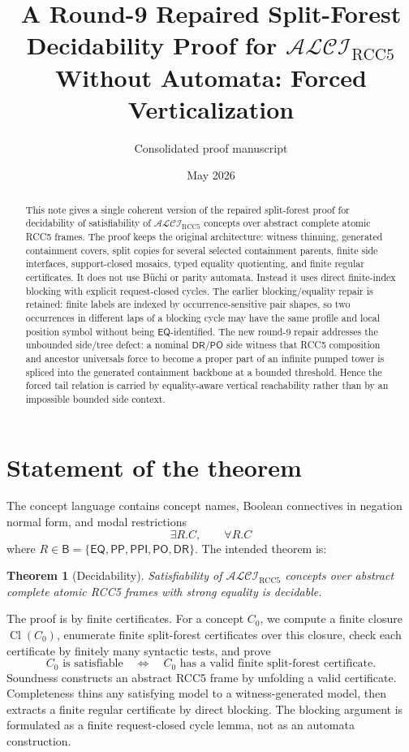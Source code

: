 \documentclass[11pt]{article}
\title{A Round-9 Repaired Split-Forest Decidability Proof for \texorpdfstring{$\mathcal{ALCI}_{\mathrm{RCC5}}$}{ALCI-RCC5} Without Automata: Forced Verticalization}
\author{Consolidated proof manuscript}
\date{May 2026}
\newtheorem{theorem}{Theorem}[section]
\newcommand{\ALCIRCC}{\ensuremath{\mathcal{ALCI}_{\mathrm{RCC5}}}}
\newcommand{\Cl}{\operatorname{Cl}}
\newcommand{\Base}{\mathsf B}
\newcommand{\EQ}{\mathsf{EQ}}
\newcommand{\PP}{\mathsf{PP}}
\newcommand{\PPI}{\mathsf{PPI}}
\newcommand{\PO}{\mathsf{PO}}
\newcommand{\DR}{\mathsf{DR}}
\begin{document}
\maketitle

\begin{abstract}
This note gives a single coherent version of the repaired split-forest proof for decidability of satisfiability of \(\ALCIRCC\) concepts over abstract complete atomic RCC5 frames.  The proof keeps the original architecture: witness thinning, generated containment covers, split copies for several selected containment parents, finite side interfaces, support-closed mosaics, typed equality quotienting, and finite regular certificates.  It does not use Büchi or parity automata.  Instead it uses direct finite-index blocking with explicit request-closed cycles.  The earlier blocking/equality repair is retained: finite labels are indexed by occurrence-sensitive pair shapes, so two occurrences in different laps of a blocking cycle may have the same profile and local position symbol without being \(\EQ\)-identified.  The new round-9 repair addresses the unbounded side/tree defect: a nominal \(\DR/\PO\) side witness that RCC5 composition and ancestor universals force to become a proper part of an infinite pumped tower is spliced into the generated containment backbone at a bounded threshold.  Hence the forced tail relation is carried by equality-aware vertical reachability rather than by an impossible bounded side context.
\end{abstract}

\tableofcontents

\section{Statement of the theorem}

The concept language contains concept names, Boolean connectives in negation normal form, and modal restrictions
\[
  \exists R.C,\qquad \forall R.C
\]
where \(R\in\Base=\{\EQ,\PP,\PPI,\PO,\DR\}\).  The intended theorem is:

\begin{theorem}[Decidability]\label{thm:main}
Satisfiability of \(\ALCIRCC\) concepts over abstract complete atomic RCC5 frames with strong equality is decidable.
\end{theorem}

The proof is by finite certificates.  For a concept \(C_0\), we compute a finite closure \(\Cl(C_0)\), enumerate finite split-forest certificates over this closure, check each certificate by finitely many syntactic tests, and prove
\[
  C_0 \text{ is satisfiable}
  \quad\Longleftrightarrow\quad
  C_0 \text{ has a valid finite split-forest certificate.}
\]
Soundness constructs an abstract RCC5 frame by unfolding a valid certificate.  Completeness thins any satisfying model to a witness-generated model, then extracts a finite regular certificate by direct blocking.  The blocking argument is formulated as a finite request-closed cycle lemma, not as an automata construction.
\end{document}
